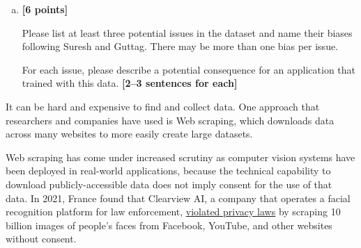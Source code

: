 \pagebreak
\begin{enumerate}[(a)]
    \item \textbf{[6 points]}
    \begin{tcolorbox}[colback=orange!5!white,colframe=orange!75!black]

    Please list at least three potential issues in the dataset and name their biases following Suresh and Guttag. There may be more than one bias per issue. 

    For each issue, please describe a potential consequence for an application that trained with this data. \textbf{[2--3 sentences for each]}
    \end{tcolorbox}


\end{enumerate}

\pagebreak
It can be hard and expensive to find and collect data. One approach that researchers and companies have used is Web scraping, which downloads data across many websites to more easily create large datasets.

Web scraping has come under increased scrutiny as computer vision systems have been deployed in real-world applications, because the technical capability to download publicly-accessible data does not imply consent for the use of that data. In 2021, France found that Clearview AI, a company that operates a facial recognition platform for law enforcement, \href{https://techcrunch.com/2021/12/16/clearview-gdpr-breaches-france/}{violated privacy laws} by scraping 10 billion images of people's faces from Facebook, YouTube, and other websites without consent.

